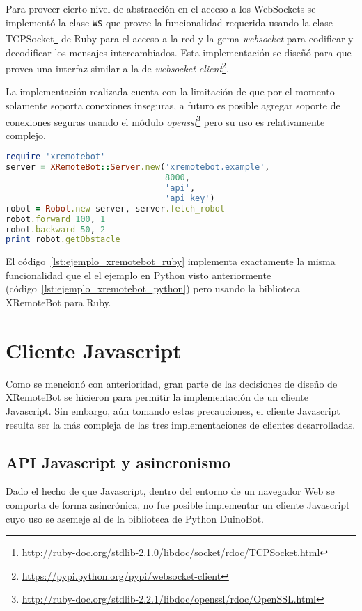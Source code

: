 Para proveer cierto nivel de abstracción en el acceso a los WebSockets
se implementó la clase
\texttt{WS} que provee la funcionalidad requerida
usando la clase TCPSocket\footnote{\url{http://ruby-doc.org/stdlib-2.1.0/libdoc/socket/rdoc/TCPSocket.html}}
de Ruby para el acceso a la red y
la gema \textit{websocket} para codificar y decodificar los mensajes intercambiados.
Esta implementación se diseñó para que provea una interfaz similar a la de
\textit{websocket-client}\footnote{\url{https://pypi.python.org/pypi/websocket-client}}.

La implementación realizada cuenta con la limitación de que por
el momento solamente soporta conexiones inseguras, a futuro es
posible agregar soporte de conexiones seguras usando el módulo
\textit{openssl}\footnote{\url{http://ruby-doc.org/stdlib-2.2.1/libdoc/openssl/rdoc/OpenSSL.html}}
pero su uso es relativamente complejo.

\begin{lstlisting}[language=Ruby,
caption={Ejemplo usando XRemoteBot para Ruby},
label=lst:ejemplo_xremotebot_ruby]
require 'xremotebot'
server = XRemoteBot::Server.new('xremotebot.example',
                                8000,
                                'api',
                                'api_key')
robot = Robot.new server, server.fetch_robot
robot.forward 100, 1
robot.backward 50, 2
print robot.getObstacle
\end{lstlisting}

El código~\ref{lst:ejemplo_xremotebot_ruby} implementa exactamente la misma funcionalidad que
el el ejemplo en Python visto anteriormente (código~\ref{lst:ejemplo_xremotebot_python}) pero
usando la biblioteca XRemoteBot para Ruby.

\section{Cliente Javascript}\label{sec:javascript}
Como se mencionó con anterioridad, gran parte de las decisiones de diseño de XRemoteBot
se hicieron para permitir la implementación de un cliente Javascript. Sin embargo, aún
tomando estas precauciones, el cliente Javascript resulta ser la más compleja de las
tres implementaciones de clientes desarrolladas.

\subsection{API Javascript y asincronismo}
Dado el hecho
de que Javascript, dentro del entorno de un navegador Web se comporta de forma asincrónica,
no fue posible implementar un cliente Javascript cuyo uso se asemeje al de la biblioteca
de Python DuinoBot.

